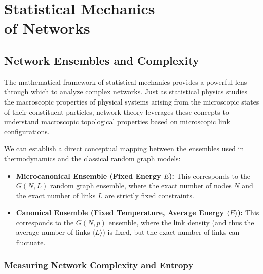 \chapter[Statistical Mechanics of Networks]{Statistical Mechanics\\of Networks}

\section{Network Ensembles and Complexity}
\label{sec:ensembles_and_complexity}

The mathematical framework of statistical mechanics provides a powerful lens through which to analyze complex networks. Just as statistical physics studies the macroscopic properties of physical systems arising from the microscopic states of their constituent particles, network theory leverages these concepts to understand macroscopic topological properties based on microscopic link configurations.

We can establish a direct conceptual mapping between the ensembles used in thermodynamics and the classical random graph models:
\begin{itemize}
    \item \textbf{Microcanonical Ensemble (Fixed Energy \(E\)):} This corresponds to the \(G(N,L)\) random graph ensemble, where the exact number of nodes \(N\) and the exact number of links \(L\) are strictly fixed constraints.
    \item \textbf{Canonical Ensemble (Fixed Temperature, Average Energy \(\langle E \rangle\)):} This corresponds to the \(G(N,p)\) ensemble, where the link density (and thus the average number of links \(\langle L \rangle\)) is fixed, but the exact number of links can fluctuate.
\end{itemize}


\subsection{Measuring Network Complexity and Entropy}
\label{subsec:measuring_complexity}

